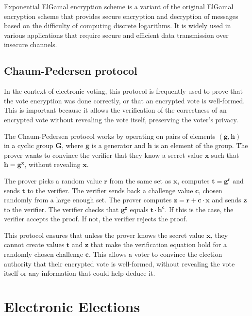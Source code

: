 Exponential ElGamal encryption scheme is a variant of the original ElGamal encryption scheme that provides secure encryption and decryption of messages based on the difficulty of computing discrete logarithms. It is widely used in various applications that require secure and efficient data transmission over insecure channels.


\subsection{Chaum-Pedersen protocol}

In the context of electronic voting, this protocol is frequently used to prove that the vote encryption was done correctly, or that an encrypted vote is well-formed. This is important because it allows the verification of the correctness of an encrypted vote without revealing the vote itself, preserving the voter's privacy.

The Chaum-Pedersen protocol works by operating on pairs of elements $(\mathbf{g},\mathbf{h})$ in a cyclic group $\mathbf{G}$, where $\mathbf{g}$ is a generator and $\mathbf{h}$ is an element of the group. The prover wants to convince the verifier that they know a secret value $\mathbf{x}$ such that $\mathbf{h} = \mathbf{g}^{\mathbf{x}}$, without revealing $\mathbf{x}$.

The prover picks a random value $\mathbf{r}$ from the same set as $\mathbf{x}$, computes $\mathbf{t} = \mathbf{g}^{\mathbf{r}}$ and sends $\mathbf{t}$ to the verifier.
The verifier sends back a challenge value $\mathbf{c}$, chosen randomly from a large enough set.
The prover computes $\mathbf{z} = \mathbf{r} + \mathbf{c}\cdot\mathbf{x}$ and sends $\mathbf{z}$ to the verifier.
The verifier checks that $\mathbf{g}^{\mathbf{z}}$ equals $\mathbf{t}\cdot\mathbf{h}^{\mathbf{c}}$. If this is the case, the verifier accepts the proof. If not, the verifier rejects the proof.

This protocol ensures that unless the prover knows the secret value $\mathbf{x}$, they cannot create values $\mathbf{t}$ and $\mathbf{z}$ that make the verification equation hold for a randomly chosen challenge $\mathbf{c}$. This allows a voter to convince the election authority that their encrypted vote is well-formed, without revealing the vote itself or any information that could help deduce it.


\section{Electronic Elections}

